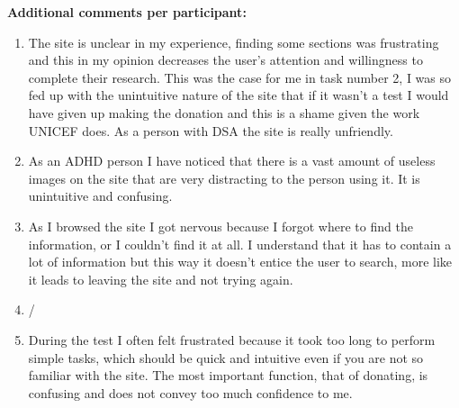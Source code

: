 \vspace{0.25cm}

\textbf{Additional comments per participant:}
\begin{enumerate}
	\item The site is unclear in my experience, finding some sections was frustrating and this in my opinion decreases the user's attention and willingness to complete their research. This was the case for me in task number 2, I was so fed up with the unintuitive nature of the site that if it wasn't a test I would have given up making the donation and this is a shame given the work UNICEF does. As a person with DSA the site is really unfriendly.
	\item As an ADHD person I have noticed that there is a vast amount of useless images on the site that are very distracting to the person using it. It is unintuitive and confusing.
	\item As I browsed the site I got nervous because I forgot where to find the information, or I couldn't find it at all. I understand that it has to contain a lot of information but this way it doesn't entice the user to search, more like it leads to leaving the site and not trying again.
	\item /
	\item During the test I often felt frustrated because it took too long to perform simple tasks, which should be quick and intuitive even if you are not so familiar with the site. The most important function, that of donating, is confusing and does not convey too much confidence to me.
\end{enumerate}